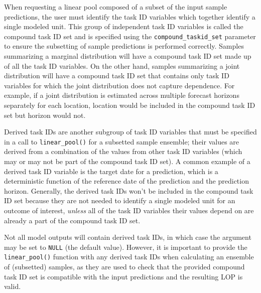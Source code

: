 \documentclass[
  letterpaper,
  DIV=11,
  numbers=noendperiod]{scrartcl}
\begin{document}
When requesting a linear pool composed of a subset of the input sample
predictions, the user must identify the task ID variables which together
identify a single modeled unit. This group of independent task ID
variables is called the compound task ID set and is specified using the
\texttt{compound\_taskid\_set} parameter to ensure the subsetting of
sample predictions is performed correctly. Samples summarizing a
marginal distribution will have a compound task ID set made up of all
the task ID variables. On the other hand, samples summarizing a joint
distribution will have a compound task ID set that contains only task ID
variables for which the joint distribution does not capture dependence.
For example, if a joint distribution is estimated across multiple
forecast horizons separately for each location, location would be
included in the compound task ID set but horizon would not.

Derived task IDs are another subgroup of task ID variables that must be
specified in a call to \texttt{linear\_pool()} for a subsetted sample
ensemble; their values are derived from a combination of the values from
other task ID variables (which may or may not be part of the compound
task ID set). A common example of a derived task ID variable is the
target date for a prediction, which is a deterministic function of the
reference date of the prediction and the prediction horizon. Generally,
the derived task IDs won't be included in the compound task ID set
because they are not needed to identify a single modeled unit for an
outcome of interest, \emph{unless} all of the task ID variables their
values depend on are already a part of the compound task ID set.

Not all model outputs will contain derived task IDs, in which case the
argument may be set to \texttt{NULL} (the default value). However, it is
important to provide the \texttt{linear\_pool()} function with any
derived task IDs when calculating an ensemble of (subsetted) samples, as
they are used to check that the provided compound task ID set is
compatible with the input predictions and the resulting LOP is valid.
\end{document}
